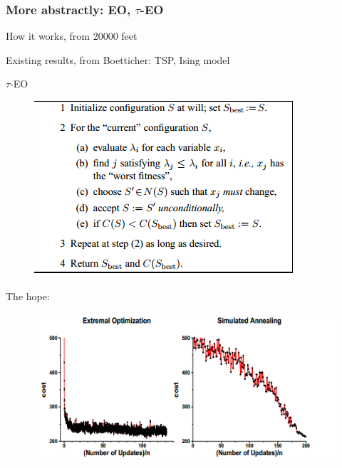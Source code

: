 \documentclass{beamer}
\begin{document}
\begin{frame}
  \frametitle{More abstractly: EO, $\tau$-EO}
  How it works, from 20000 feet

  Existing results, from Boetticher: TSP, Ising model

  $\tau$-EO
  \begin{figure}
    \includegraphics{eo_alg}
  \end{figure}

  The hope:
  \begin{figure}
    \includegraphics{boettcher}
  \end{figure}
\end{frame}
\end{document}
